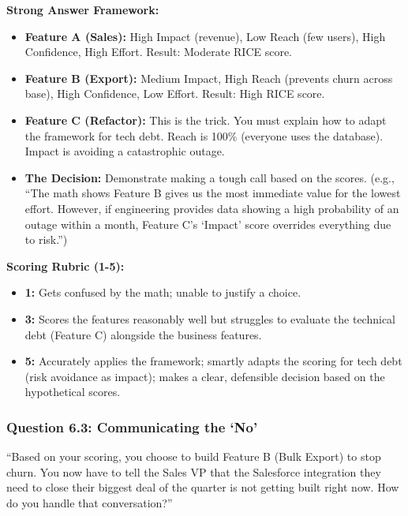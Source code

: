 \textbf{Strong Answer Framework:}

\begin{itemize}
\tightlist
\item
  \textbf{Feature A (Sales):} High Impact (revenue), Low Reach (few
  users), High Confidence, High Effort. Result: Moderate RICE score.
\item
  \textbf{Feature B (Export):} Medium Impact, High Reach (prevents churn
  across base), High Confidence, Low Effort. Result: High RICE score.
\item
  \textbf{Feature C (Refactor):} This is the trick. You must explain how
  to adapt the framework for tech debt. Reach is 100\% (everyone uses
  the database). Impact is avoiding a catastrophic outage.
\item
  \textbf{The Decision:} Demonstrate making a tough call based on the
  scores. (e.g., ``The math shows Feature B gives us the most immediate
  value for the lowest effort. However, if engineering provides data
  showing a high probability of an outage within a month, Feature C's
  `Impact' score overrides everything due to risk.'')
\end{itemize}

\textbf{Scoring Rubric (1-5):}

\begin{itemize}
\tightlist
\item
  \textbf{1:} Gets confused by the math; unable to justify a choice.
\item
  \textbf{3:} Scores the features reasonably well but struggles to
  evaluate the technical debt (Feature C) alongside the business
  features.
\item
  \textbf{5:} Accurately applies the framework; smartly adapts the
  scoring for tech debt (risk avoidance as impact); makes a clear,
  defensible decision based on the hypothetical scores.
\end{itemize}

\subsubsection{Question 6.3: Communicating the
`No'}\label{question-6.3-communicating-the-no}

``Based on your scoring, you choose to build Feature B (Bulk Export) to
stop churn. You now have to tell the Sales VP that the Salesforce
integration they need to close their biggest deal of the quarter is not
getting built right now. How do you handle that conversation?''

